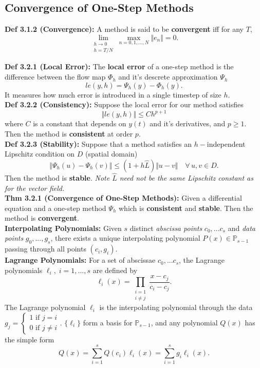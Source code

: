 \documentclass[10pt,a4paper]{article}
\renewcommand{\P}{\mathbb{P}}
\newcommand{\norm}[1]{\Vert #1 \Vert}
\begin{document}
\begin{multicols*}{2}
\section{Convergence of One-Step Methods}

\textbf{Def 3.1.2 (Convergence):} A method is said to be \textbf{convergent} iff for any $T$, \[\lim_{\begin{smallmatrix}
    h \to 0 \\ h = T/N
\end{smallmatrix}} \max_{n = 0,1,...,N}{\Vert e_n \Vert} = 0.\]

\textbf{Def 3.2.1 (Local Error):} The \textbf{local error} of a one-step method is the difference between the flow map $\Phi_h$ and it's descrete approximation $\Psi_h$ 
\[ le(y, h) = \Psi_h(y) - \Phi_h(y).\]
It measures how much error is introduced in a single timestep of size $h$.\\

\textbf{Def 3.2.2 (Consistency):} Suppose the local error for our method satisfies 
\[ \Vert le(y, h) \Vert \leq Ch^{p + 1} \]
 where $C$ is a constant that depends on $y(t)$ and it's derivatives, and $p \geq 1$. Then the method is \textbf{consistent} at order $p$.\\

\textbf{Def 3.2.3 (Stability):} Suppose that a method satisfies an $h-$independent Lipschitz condition on $D$ (spatial domain)
 \[ \norm{\Psi_h(u) - \Psi_h(v)} \leq (1 + h\hat L)\norm{u - v} \quad \forall\, u, v \in D. \]
 Then the method is \textbf{stable}. \textit{Note $\hat L$ need not be the same Lipschitz constant as for the vector field.}\\

\textbf{Thm 3.2.1 (Convergence of One-Step Methods):} Given a differential equation and a one-step method $\Psi_h$ which is \textbf{consistent} and \textbf{stable}. Then the method is \textbf{convergent}.\\

\textbf{Interpolating Polynomials:} Given $s$ distinct \textit{abscissa points} $c_0, ... c_s$ and \textit{data points} $g_0, ..., g_s$, there exists a unique interpolating polynomial $P(x) \in \P_{s - 1}$ passing through all points $(c_i, g_i)$.\\

\textbf{Lagrange Polynomials:} For a set of abscissae $c_0, ... c_s$, the Lagrange polynomials $\ell_i, \; i = 1,...,s$ are defined by \[
\ell_i(x) = \prod_{\begin{smallmatrix}i = 1 \\ i \neq j\end{smallmatrix}} \frac{x - c_j}{c_i - c_j}.
\]
The Lagrange polynomial $\ell_i$ is the interpolating polynomial through the data $g_j = \begin{cases*} 1 \text{ if } j = i \\ 0 \text{ if } j \neq i \end{cases*}$. $\{\ell_i\}$ form a basis for $\P_{s - 1}$, and any polynomial $Q(x)$ has the simple form \[
Q(x) = \sum_{i=1}^s Q(c_i) \ell_i(x) =  \sum_{i=1}^s g_i \ell_i(x) .   
\]


\end{multicols*}
\end{document}
